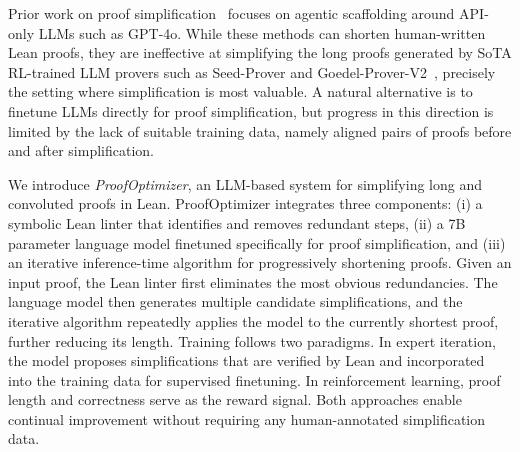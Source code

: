 Prior work on proof simplification~\citep{ahuja2024improver} focuses on agentic scaffolding around API-only LLMs such as GPT-4o. While these methods can shorten human-written Lean proofs, they are ineffective at simplifying the long proofs generated by SoTA RL-trained LLM provers such as Seed-Prover and Goedel-Prover-V2~\citep{lin2025goedel2}, precisely the setting where simplification is most valuable. A natural alternative is to finetune LLMs directly for proof simplification, but progress in this direction is limited by the lack of suitable training data, namely aligned pairs of proofs before and after simplification.
%

We introduce \emph{ProofOptimizer}, an LLM-based system for simplifying long and convoluted proofs in Lean. ProofOptimizer integrates three components: (i) a symbolic Lean linter that identifies and removes redundant steps, (ii) a 7B parameter language model finetuned specifically for proof simplification, and (iii) an iterative inference-time algorithm for progressively shortening proofs. Given an input proof, the Lean linter first eliminates the most obvious redundancies. The language model then generates multiple candidate simplifications, and the iterative algorithm repeatedly applies the model to the currently shortest proof, further reducing its length. Training follows two paradigms. In expert iteration, the model proposes simplifications that are verified by Lean and incorporated into the training data for supervised finetuning. In reinforcement learning, proof length and correctness serve as the reward signal. Both approaches enable continual improvement without requiring any human-annotated simplification data.


